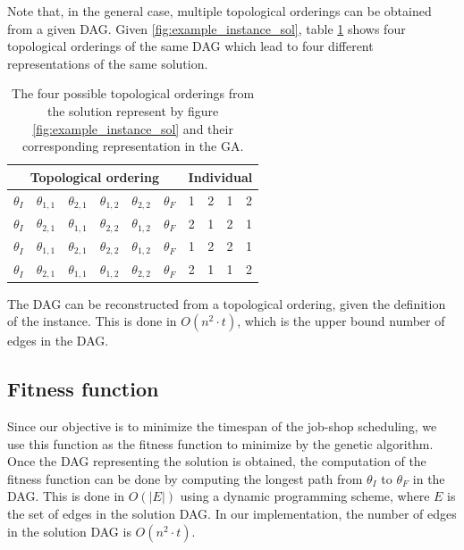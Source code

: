 \documentclass[10pt,a4paper]{article}
\begin{document}
Note that, in the general case, multiple topological orderings can be obtained from a given DAG. Given \ref{fig:example_instance_sol}, table \ref{tab:example_instance_sols} shows four topological orderings of the same DAG which lead to four different representations of the same solution.

\begin{table}[h]
\centering
\begin{tabular}{|cccccc|cccc|}
\hline
\multicolumn{6}{|c|}{Topological ordering} & \multicolumn{4}{|c|}{Individual}\\
\hline
$\theta_I$ & $\theta_{1,1}$ & $\theta_{2,1}$ & $\theta_{1,2}$ & $\theta_{2,2}$ & $\theta_F$ & 1 & 2 & 1 & 2 \\
\hline
$\theta_I$ & $\theta_{2,1}$ & $\theta_{1,1}$ & $\theta_{2,2}$ & $\theta_{1,2}$ & $\theta_F$ & 2 & 1 & 2 & 1 \\
\hline
$\theta_I$ & $\theta_{1,1}$ & $\theta_{2,1}$ & $\theta_{2,2}$ & $\theta_{1,2}$ & $\theta_F$ & 1 & 2 & 2 & 1 \\
\hline
$\theta_I$ & $\theta_{2,1}$ & $\theta_{1,1}$ & $\theta_{1,2}$ & $\theta_{2,2}$ & $\theta_F$ & 2 & 1 & 1 & 2\\
\hline
\end{tabular}
\caption{The four possible topological orderings from the solution represent by figure \ref{fig:example_instance_sol} and their corresponding representation in the GA.}
\label{tab:example_instance_sols}
\end{table}

The DAG can be reconstructed from a topological ordering, given the definition of the instance. This is done in $O(n^2 \cdot t)$, which is the upper bound number of edges in the DAG.

\subsection{Fitness function}
Since our objective is to minimize the timespan of the job-shop scheduling, we use this function as the fitness function to minimize by the genetic algorithm. Once the DAG representing the solution is obtained, the computation of the fitness function can be done by computing the longest path from $\theta_I$ to $\theta_F$ in the DAG. This is done in $O(|E|)$ using a dynamic programming scheme, where $E$ is the set of edges in the solution DAG. In our implementation, the number of edges in the solution DAG is $O(n^2 \cdot t)$.
\end{document}
